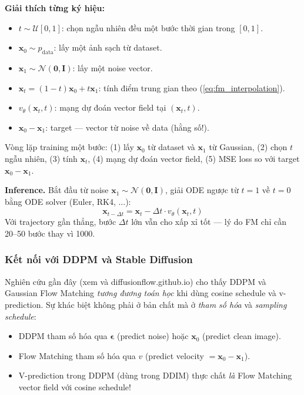 \textbf{Giải thích từng ký hiệu:}
\begin{itemize}
    \item $t \sim \mathcal{U}[0,1]$: chọn ngẫu nhiên đều một bước thời gian trong $[0,1]$.
    \item $\mathbf{x}_0 \sim p_\text{data}$: lấy một ảnh sạch từ dataset.
    \item $\mathbf{x}_1 \sim \mathcal{N}(\mathbf{0},\mathbf{I})$: lấy một noise vector.
    \item $\mathbf{x}_t = (1-t)\mathbf{x}_0 + t\mathbf{x}_1$: tính điểm trung gian theo (\ref{eq:fm_interpolation}).
    \item $v_\theta(\mathbf{x}_t, t)$: mạng dự đoán vector field tại $(\mathbf{x}_t, t)$.
    \item $\mathbf{x}_0 - \mathbf{x}_1$: target --- vector từ noise về data (hằng số!).
\end{itemize}

Vòng lặp training một bước: (1) lấy $\mathbf{x}_0$ từ dataset và $\mathbf{x}_1$ từ Gaussian, (2) chọn $t$ ngẫu nhiên, (3) tính $\mathbf{x}_t$, (4) mạng dự đoán vector field, (5) MSE loss so với target $\mathbf{x}_0 - \mathbf{x}_1$.

\textbf{Inference.}
Bắt đầu từ noise $\mathbf{x}_1 \sim \mathcal{N}(\mathbf{0}, \mathbf{I})$, giải ODE ngược từ $t=1$ về $t=0$ bằng ODE solver (Euler, RK4, ...):
\[
    \mathbf{x}_{t-\Delta t} = \mathbf{x}_t - \Delta t \cdot v_\theta(\mathbf{x}_t, t)
\]
Với trajectory gần thẳng, bước $\Delta t$ lớn vẫn cho xấp xỉ tốt --- lý do FM chỉ cần 20--50 bước thay vì 1000.

\subsubsection{Kết nối với DDPM và Stable Diffusion}

Nghiên cứu gần đây (xem \cite{Lipman2022} và diffusionflow.github.io) cho thấy DDPM và Gaussian Flow Matching \textit{tương đương toán học} khi dùng cosine schedule và v-prediction. Sự khác biệt không phải ở bản chất mà ở \textit{tham số hóa} và \textit{sampling schedule}:
\begin{itemize}
    \item DDPM tham số hóa qua $\boldsymbol{\epsilon}$ (predict noise) hoặc $\mathbf{x}_0$ (predict clean image).
    \item Flow Matching tham số hóa qua $v$ (predict velocity $= \mathbf{x}_0 - \mathbf{x}_1$).
    \item V-prediction trong DDPM (dùng trong DDIM) thực chất \textit{là} Flow Matching vector field với cosine schedule!
\end{itemize}

